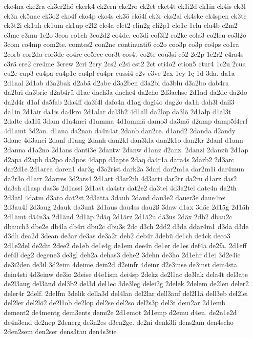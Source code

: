 {cke4na
cke2ra
ck3er2hö
ckerk4
ck2ern
cke2ro
ck2et
cket4t
ck1i2d
ck1in
ck4is
ck3l
ck3n
ck5nac
ck3o2
cko4f
cko4p
cko4s
ck3ö
ckö4f
ck3r
cks2al
ck4ske
ck4spen
ck3te
ck3t2i
ck1uh
ck1um
ck1up
c2l2
cle4a
clet2
clin2g
cli2p1
clo1c
1clu
clu4b
c2m2
c3me
c3mu
1c2o
3coa
co1ch
3co2d2
co4de.
co3di
cof3f2
co2ke
cola3
co2leu
co3l2o
3com
co4mp
com2te.
comtes2
con2ne
continuati6
co2o
coo3p
co3p
co4ps
co1ra
2corb
cor2da
cor3de
co4re
co5ree
cor3t
cos4t
co2te
cou3si
cô2
2c2p
1c2r2
c4ra4s
c3rä
cre2
cre4me
3crew
2cri
2cry
2cs2
c2si
cst2
2ct
cti4o2
ction5
ctur4
1c2u
2cua
cu2e
cup3
cu4pa
cu4p1e
cu4pl
cu4pr
cussi4
c2v
c3ve
2cx
1cy
1ç
1d
3da.
da1a
2d1aal
2d1ab
d3a2bak
d2abä
d2abe
d3a2ben
d3a2bi
da3blu
d3a2bo
dab4ra
da2bri
da3brie
d2ab4rü
d1ac
dach3a
dache4
da2cho
2d3achse
2d1ad
da2de
da2do
da2d4r
d1af
da5fab
2da4ff
da3f4l
dafo4n
d1ag
dagi4o
dag2o
da1h
dah3l
dail3
da1in
2d1air
da1is
da4kro
2d1alar
dal3b2
4d1all
da2lop
da3lö
2d1alp
d1al3t
2dalte
da1lü
3dam
d1a4mei
d1amma
4d1ammä
damo3
da3mö
d2amp
damp5f4erf
4d1amt
3d2an.
d1ana
da2nan
da4n4at
2danb
dan2ce.
d1and2
2danda
d2andy
3dane
4d3anei
2danf
d1ang
2danh
dan2kl
dan3kla
dan2k1o
dan2kr
2danl
d1ann
2danna
d1a2no
2d1ans
danti3e
2dantw
2danw
d1anz
d2anz.
2danzi
2danzü
2d1ap
d2apa
d2aph
da2po
da3pos
4dapp
d3apte
2daq
da4r1a
dara4s
2darb2
2d3arc
dar2d1e
2d1area
daren1
dar3g
d3a2rist
dark2a
3darl
dar2m1a
dar2m1i
dar4mun
da2r3o
d1arr
2darres
3d2ars4
2d1art
d3ar2th
4d3arti
dar2tr
da2ru
d1arz
das2
da3sh
d1asp
das3s
2d1assi
2d1ast
da4str
dat2e2
da3tei
4d3a2tel
date4n
da2th
2d3atl
4datm
d3ato
dat2st
2d3atta
3daub
2daud
dau3e2
dauer3e
daue4rei
2d3au4f
2d3aug
2dauk
da3unt
2d1aus
dau4ss
dau2ß
3daw
d1ax
3däc
2d1äg
2d1äh
2d1ämt
dä4n3a
2d1änd
2d1äp
2däq
2d1ärz
2d1ä2u
dä3us
2däx
2db2
dbau2c
dbauch3
dbe2e
db4la
db4ri
dbu2c
dbu3s
2dc
d3ch
2dd2
d3da
ddar4m1
d3dä
d3de
d3dh
dea2d
3dean
de3ar
de3as
de3a2t
deb2
deb4r
3debü
de1ch
de4ck
deco3
2d1e2del
de2dit
2dee2
de1eb
de1e4g
de1em
dee4n
de1er
de1es
def4a
de2fa.
2d1eff
def4l
deg2
degene3
de3gl
deh2a
dehas3
dehe2
3dehn
de3ho
2d1ehr
d1ei
3d2e4ic
de3i2den
de3il
3d2eim
4deime
dein2d
d2einfr
4deinr
d2e3inse
de3inst
dein4sta
dein4sti
4d3einw
de3io
2deise
d4e1ism
dei4sp
2dekz
de2l1ac
de3lak
dela4t
del3ate
de2l3aug
del3änd
del3b2
del3d
del1ec
3de3leg
delei2g
2delek
2delem
de2len
deler2
deler4r
2delf.
2delfm
3delik
della3d
del4lan
del2lar
dell3auf
del2l1ä
dell3eb
del2lei
del2ler
del2lö2
de2l1ob
de2lop
del2se
del2so
del2s3p
del3t
dem2ar
2d1emb
dement2
de4mentg
dem3ents
demi2e
2d1emot
2d1emp
d2emu
d4en.
de2n1e2d
de4n3end
de2nep
2denerg
de3n2es
d3en2ge.
de2ni
denk3li
dens2am
den4scho
2den2sem
den2ser
dens3tau
den4s3tie
}

